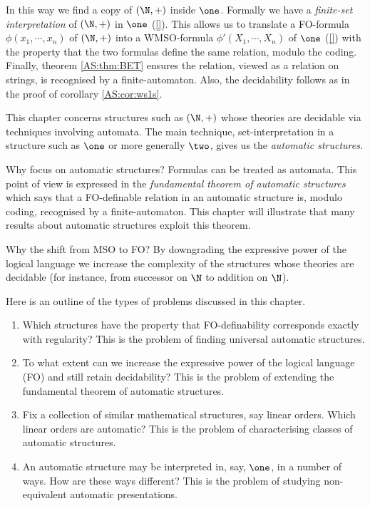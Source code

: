 In this way we find a copy of $(\N,+)$ inside $\one$. Formally we have a
{\em finite-set interpretation} of $(\N,+)$ in $\one$ (\ref{}). This allows us to
translate a FO-formula $\phi(x_1,\cdots,x_n)$ of $(\N,+)$ into a WMSO-formula
$\phi'(X_1,\cdots,X_n)$ of $\one$ (\ref{}) with the property that
the two formulas define the same relation, modulo the coding. Finally, theorem \ref{AS:thm:BET} ensures
the relation, viewed as a relation on strings, is recognised by a
finite-automaton. Also,  the decidability follows as in the proof of
corollary \ref{AS:cor:ws1s}.

This chapter concerns structures such as $(\N,+)$ whose theories are
decidable via techniques involving automata. The main technique,
set-interpretation in a structure such as $\one$ or more generally $\two$,
gives us the \emph{automatic structures}. 

Why focus on automatic structures?  Formulas can be treated as automata.  This
point of view is expressed in the {\em fundamental theorem of automatic
structures} which says that a FO-definable relation in an automatic structure
is, modulo coding, recognised by a finite-automaton. This chapter will
illustrate that many results about automatic structures exploit this theorem.

Why the shift from MSO to FO? By downgrading the expressive power of the logical
language we increase the complexity of the structures whose theories are
decidable (for instance, from successor on $\N$ to addition on $\N$).

Here is an outline of the types of problems discussed in this chapter.

\begin{enumerate}
\item Which structures have the property that FO-definability corresponds exactly with regularity? 
This is the problem of finding universal automatic structures.
\item To what extent can we increase the expressive power of the logical language (FO) and still retain decidability? 
This is the problem of extending the fundamental theorem of automatic structures.
\item Fix a collection of similar mathematical structures, say linear orders. Which linear orders are automatic? 
This is the problem of characterising classes of automatic structures.
\item An automatic structure may be interpreted in, say, $\one$, in a number of ways. How are these ways different?
This is the problem of studying non-equivalent automatic presentations.
\end{enumerate}

